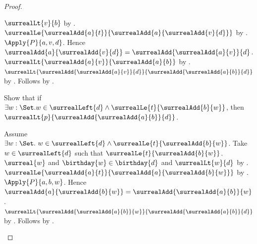 \begin{proof}
\begin{subproof}
\begin{subproof}
\begin{byCase}
\begin{subproof}
                            $\surrealLt{v}{b}$
                            by .
                        $\surrealLe{\surrealAdd{a}{t}}
                            {\surrealAdd{a}{\surrealAdd{v}{d}}}$
                            by .
                        $\Apply{P}{a,v,d}$.
                        Hence $\surrealAdd{a}{\surrealAdd{v}{d}}=
                            \surrealAdd{\surrealAdd{a}{v}}{d}$.
                        $\surrealLt{\surrealAdd{a}{v}}
                            {\surrealAdd{a}{b}}$
                            by .
                        $\surrealLt{\surrealAdd{\surrealAdd{a}{v}}{d}}
                            {\surrealAdd{\surrealAdd{a}{b}}{d}}$
                            by .
                        Follows by .
                    \end{subproof}
                    Show that if $\exists w:\Set.
                            w\in\surrealLeft{d}\land
                            \surrealLe{t}{\surrealAdd{b}{w}}$, then
                        $\surrealLt{p}{\surrealAdd{\surrealAdd{a}{b}}{d}}$.
                    \begin{subproof}
                        Assume $\exists w:\Set.\ w\in\surrealLeft{d}\land
                            \surrealLe{t}{\surrealAdd{b}{w}}$.
                        Take $w\in\surrealLeft{d}$ such that
                            $\surrealLe{t}{\surrealAdd{b}{w}}$.
                        $\surreal{w}$ and $\birthday{w}\in\birthday{d}$ and
                            $\surrealLt{w}{d}$
                            by .
                        $\surrealLe{\surrealAdd{a}{t}}
                            {\surrealAdd{a}{\surrealAdd{b}{w}}}$
                            by .
                        $\Apply{P}{a,b,w}$.
                        Hence $\surrealAdd{a}{\surrealAdd{b}{w}}=
                            \surrealAdd{\surrealAdd{a}{b}}{w}$.
                        $\surrealLt{\surrealAdd{\surrealAdd{a}{b}}{w}}
                            {\surrealAdd{\surrealAdd{a}{b}}{d}}$
                            by .
                        Follows by .
                    \end{subproof}
            \end{byCase}

\end{subproof}
\end{subproof}
\end{proof}
